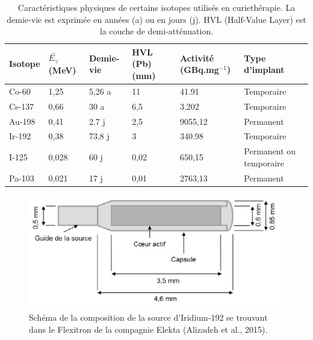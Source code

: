 \begin {table}[!ht]
\caption{Caractéristiques physiques de certains isotopes  utilisés en curiethérapie. La demie-vie est exprimée en années (a) ou en jours (j). HVL (Half-Value Layer) est la couche de demi-atténuation. }
\label{Sources} 
\renewcommand{\arraystretch}{1.4}
	\begin{tabular}{p{1.8cm} p{1.9cm} p{1.9cm} p{1.9cm}p{2.5cm} p{2.8cm}}
	\toprule[1.25pt]
       \hline
        Isotope & $\stackrel{-}{E_{\gamma}}$ (MeV) & Demie-vie  &  HVL (Pb) (mm)  &  Activité (GBq.mg$^{-1}$) & Type d'implant \\ 
         \hline
        Co-60      &      1,25     &    5,26 a    &    11     &     41.91    &   Temporaire  \\ 
        Cs-137     &      0,66     &     30 a     &    6,5    &     3,202    &   Temporaire  \\ 
        Au-198     &      0,41     &    2.7 j     &    2,5    &     9055,12  &   Permanent    \\ 
        Ir-192     &      0,38     &    73,8 j    &     3     &     340.98   &   Temporaire   \\ 
        I-125      &      0,028    &    60 j      &    0,02   &     650,15   &   Permanent ou temporaire \\ 
        Pa-103     &      0,021    &    17 j      &    0,01   &     2763,13  &   Permanent   \\ 
        \bottomrule[1.25pt]
	\end{tabular} 
\end{table}
%
\begin{figure}[!ht]
\centering
\includegraphics[width=11.0cm,height=5.0cm]{Flexitron.eps}
\caption{\label{Flexitron} Schéma de la composition de la source d’Iridium-192 se trouvant dans le Flexitron de la compagnie Elekta (Alizadeh et al., 2015).}
\end{figure}
%
